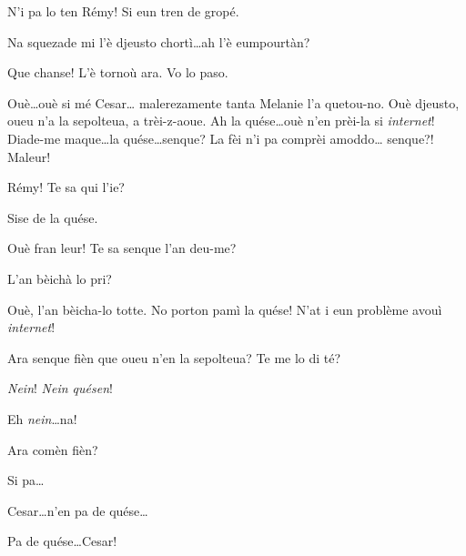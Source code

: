 \begin{drama}
\Cesarspeaks  N'i pa lo ten Rémy! Si eun tren de gropé.

\Remyspeaks{} Na squezade mi l'è djeusto chortì\ldots ah l'è eumpourtàn?


\Remyspeaks Que chanse! L'è tornoù ara. Vo lo paso.


\Cesarspeaks  Ouè\ldots ouè si mé Cesar\ldots {} malerezamente tanta Melanie l'a quetou-no. Ouè djeusto, oueu n'a la sepolteua, a trèi-z-aoue. Ah la quése\ldots ouè n'en prèi-la si \textit{internet}! Diade-me maque\ldots la quése\ldots senque? La fèi n'i pa comprèi amoddo\ldots {} senque?! Maleur!


\Cesarspeaks{}  Rémy! Te sa qui l'ie?

\Remyspeaks Sise de la quése.

\Cesarspeaks{}  Ouè fran leur! Te sa senque l'an deu-me?

\Remyspeaks L'an bèichà lo pri?

\Cesarspeaks Ouè, l'an bèicha-lo totte. No porton pamì la quése! N'at i eun problème avouì \textit{internet}!


\Cesarspeaks Ara senque fièn que oueu n'en la sepolteua? Te me lo di té?

\Hermannspeaks \textit{Nein}! \textit{Nein quésen}!

\Cesarspeaks{} Eh \textit{nein}\ldots na!

\Hermannspeaks Ara comèn fièn?

\Cesarspeaks Si pa\ldots


\Hermannspeaks Cesar\ldots n'en pa de quése\ldots


\Hermannspeaks{} Pa de quése\ldots Cesar!



\end{drama}
